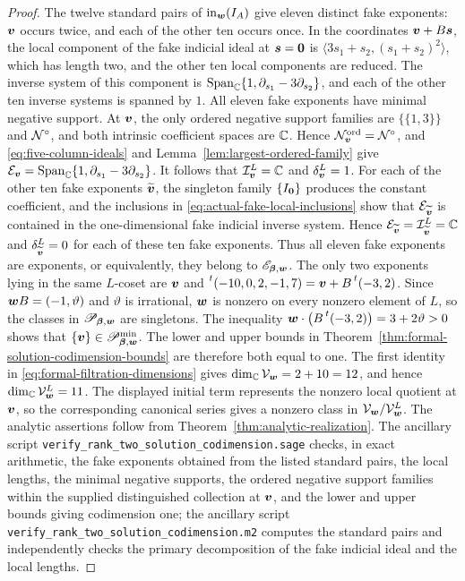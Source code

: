 \begin{proof}
	The twelve standard pairs of \(\operatorname{in}_{\boldsymbol w}(I_A)\) give eleven distinct fake exponents: \(\boldsymbol{v}\) occurs twice, and each of the other ten occurs once.
	In the coordinates \(\boldsymbol{v}+B\boldsymbol{s}\), the local component of the fake indicial ideal at \(\boldsymbol{s}=\boldsymbol{0}\) is \(\langle3s_1+s_2,(s_1+s_2)^2\rangle\), which has length two, and the other ten local components are reduced.
	The inverse system of this component is \(\operatorname{Span}_{\mathbb C}\{1,\partial_{s_1}-3\partial_{s_2}\}\), and each of the other ten inverse systems is spanned by \(1\).
	All eleven fake exponents have minimal negative support.
	At \(\boldsymbol{v}\), the only ordered negative support families are \(\{\{1,3\}\}\) and \(\mathcal N^{\circ}\), and both intrinsic coefficient spaces are \(\mathbb C\).
	Hence \(\mathcal N_{\boldsymbol{v}}^{\mathrm{ord}}=\mathcal N^{\circ}\), and \eqref{eq:five-column-ideals} and Lemma~\ref{lem:largest-ordered-family} give \(\mathcal E_{\boldsymbol{v}}=\operatorname{Span}_{\mathbb C}\{1,\partial_{s_1}-3\partial_{s_2}\}\).
	It follows that \(\mathcal I_{\boldsymbol{v}}^{L}=\mathbb C\) and \(\delta_{\boldsymbol{v}}^{L}=1\).
	For each of the other ten fake exponents \(\widetilde{\boldsymbol{v}}\), the singleton family \(\{I_{\boldsymbol{0}}\}\) produces the constant coefficient, and the inclusions in \eqref{eq:actual-fake-local-inclusions} show that \(\mathcal E_{\widetilde{\boldsymbol{v}}}\) is contained in the one-dimensional fake indicial inverse system.
	Hence \(\mathcal E_{\widetilde{\boldsymbol{v}}}=\mathcal I_{\widetilde{\boldsymbol{v}}}^{L}=\mathbb C\) and \(\delta_{\widetilde{\boldsymbol{v}}}^{L}=0\) for each of these ten fake exponents.
	Thus all eleven fake exponents are exponents, or equivalently, they belong to \(\mathscr E_{\boldsymbol{\beta},\boldsymbol{w}}\).
	The only two exponents lying in the same \(L\)-coset are \(\boldsymbol{v}\) and \(\prescript{t}{}{(-10,0,2,-1,7)}=\boldsymbol{v}+B\prescript{t}{}{(-3,2)}\).
	Since \(\boldsymbol{w} B=(-1,\vartheta)\) and \(\vartheta\) is irrational, \(\boldsymbol{w}\) is nonzero on every nonzero element of \(L\), so the classes in \(\mathscr P_{\boldsymbol{\beta},\boldsymbol{w}}\) are singletons.
	The inequality \(\boldsymbol{w}\cdot\bigl(B\prescript{t}{}{(-3,2)}\bigr)=3+2\vartheta>0\) shows that \(\{\boldsymbol{v}\}\in\mathscr P_{\boldsymbol{\beta},\boldsymbol{w}}^{\min}\).
	The lower and upper bounds in Theorem~\ref{thm:formal-solution-codimension-bounds} are therefore both equal to one.
	The first identity in \eqref{eq:formal-filtration-dimensions} gives \(\dim_{\mathbb C}\mathcal V_{\boldsymbol{w}}=2+10=12\), and hence \(\dim_{\mathbb C}\mathcal V_{\boldsymbol{w}}^{L}=11\).
	The displayed initial term represents the nonzero local quotient at \(\boldsymbol{v}\), so the corresponding canonical series gives a nonzero class in \(\mathcal V_{\boldsymbol{w}}/\mathcal V_{\boldsymbol{w}}^{L}\).
	The analytic assertions follow from Theorem~\ref{thm:analytic-realization}.
	\ifarxiv
	The ancillary script \texttt{verify\_rank\_two\_solution\_codimension.sage} checks, in exact arithmetic, the fake exponents obtained from the listed standard pairs, the local lengths, the minimal negative supports, the ordered negative support families within the supplied distinguished collection at \(\boldsymbol{v}\), and the lower and upper bounds giving codimension one; the ancillary script \texttt{verify\_rank\_two\_solution\_codimension.m2} computes the standard pairs and independently checks the primary decomposition of the fake indicial ideal and the local lengths.
	\fi
\end{proof}
